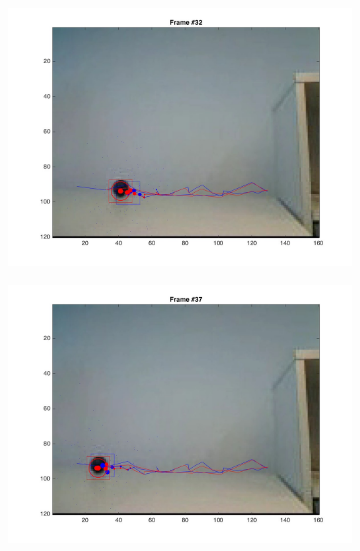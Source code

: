 \documentclass{ethz_report}
\begin{document}
\begin{figure}[h]
\begin{subfigure}[b]{.25\textwidth}
        \includegraphics[width=1\linewidth]{images/video3_particles_low_31}
    \end{subfigure}%
    \begin{subfigure}[b]{.25\textwidth}
        \centering
        \includegraphics[width=1\linewidth]{images/video3_particles_low_36}
    \end{subfigure}
    \begin{subfigure}[b]{.25\textwidth}
        \centering

\end{subfigure}
\end{figure}
\end{document}
